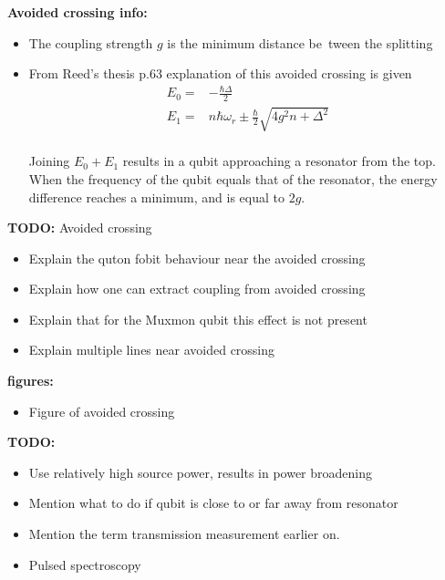 \documentclass[12pt]{report}
\begin{document}
          \textbf{Avoided crossing info:}
          \begin{itemize}
            \item The coupling strength $g$ is the minimum distance be~tween the splitting
            \item From Reed's thesis p.63 explanation of this avoided crossing is given\\
            \begin{align}
             E_0 = & -\frac{\hbar \Delta}{2}\\
             E_1 = & n \hbar\omega_r \pm \frac{\hbar}{2}\sqrt{4g^2n + \Delta^2}
            \end{align}\\
            Joining $E_0 + E_1$ results in a qubit approaching a resonator from the top.\\
            When the frequency of the qubit equals that of the resonator, the energy difference reaches a minimum, and is equal to $2g$.
          \end{itemize}

          \textbf{TODO:} Avoided crossing
          \begin{itemize}
            \item Explain the quton fobit behaviour near the avoided crossing
            \item Explain how one can extract coupling from avoided crossing
            \item Explain that for the Muxmon qubit this effect is not present
            \item Explain multiple lines near avoided crossing
          \end{itemize}

          \textbf{figures:}
          \begin{itemize}
            \item Figure of avoided crossing
          \end{itemize}


        \textbf{TODO:}
        \begin{itemize}
          \item Use relatively high source power, results in power broadening
          \item Mention what to do if qubit is close to or far away from resonator
          \item Mention the term transmission measurement earlier on.
          \item Pulsed spectroscopy
        \end{itemize}
\end{document}
